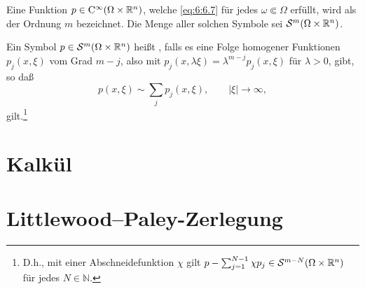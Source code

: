 \begin{df}
Eine Funktion $p\in\mathrm C^\infty(\Omega\times\mathbb R^n)$, welche \eqref{eq:6:6.7} für jedes $\omega\Subset\Omega$ erfüllt, wird als  der Ordnung $m$ bezeichnet. Die Menge aller solchen Symbole sei $\mathcal S^m(\Omega\times\mathbb R^n)$.

Ein Symbol $p\in\mathcal S^m(\Omega\times\mathbb R^n)$ heißt , falls es eine Folge homogener Funktionen $p_j(x,\xi)$ vom Grad $m-j$, also mit $p_j(x,\lambda\xi)=\lambda^{m-j}p_j(x,\xi)$ für $\lambda>0$, gibt, so daß
\begin{equation}
     p(x,\xi) \sim \sum_j p_j(x,\xi),\qquad |\xi|\to\infty,
\end{equation}
gilt.\footnote{D.h., mit einer Abschneidefunktion $\chi$ gilt $p-\sum_{j=1}^{N-1} \chi p_j\in\mathcal S^{m-N}(\Omega\times\mathbb R^n)$ für jedes $N\in\mathbb N$.}
\end{df}



\section{Kalkül}

\section{Littlewood--Paley-Zerlegung}

